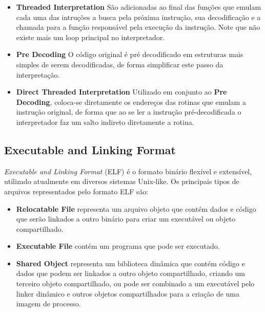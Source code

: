 \documentclass[11pt,twoside]{article}
\begin{document}
\begin{itemize}

 \item \textbf{Threaded Interpretation} São adicionadas ao final das funções que emulam cada uma das intruções a busca pela próxima instrução, sua decodificação e a chamada para a função responsável pela execução da instrução. Note que não existe mais um loop principal no interpretador.

 \item \textbf{Pre Decoding} O código original é pré decodificado em estruturas mais simples de serem decodificadas, de forma simplificar este passo da interpretação.

 \item \textbf{Direct Threaded Interpretation} Utilizado em conjunto ao \textbf{Pre Decoding}, coloca-se diretamente os endereços das rotinas que emulam a instrução original, de forma que ao se ler a instrução pré-decodificada o interpretador faz um salto indireto diretamente a rotina.

\end{itemize}

\subsection{Executable and Linking Format}


\emph{Executable and Linking Format} (ELF)\cite{SCO1997} é o formato binário flexível e extensível, utilizado atualmente em diversos sistemas Unix-like.
Os principais tipos de arquivos representados pelo formato ELF são:

\begin{itemize}
 \item \textbf{Relocatable File} representa um arquivo objeto que contém dados e código que serão linkados a outro binário para criar um executável ou objeto compartilhado.
 \item \textbf{Executable File} contém um programa que pode ser executado.
 \item \textbf{Shared Object} representa um biblioteca dinâmica que contém código e dados que podem ser linkados a outro objeto compartilhado, criando um terceiro objeto compartilhado, ou pode ser combinado a um executável pelo linker dinâmico e outros objetos compartilhados para a criação de uma imagem de processo.
\end{itemize}
\end{document}
